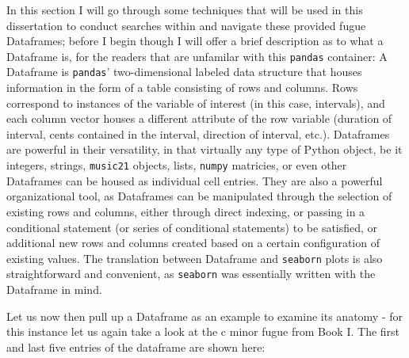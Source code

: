 In this section I will go through some techniques that will be used in
this dissertation to conduct searches within and navigate these provided
fugue Dataframes; before I begin though I will offer a brief description
as to what a Dataframe is, for the readers that are unfamilar with this
\texttt{pandas} container: A Dataframe is \texttt{pandas}'
two-dimensional labeled data structure that houses information in the
form of a table consisting of rows and columns. Rows correspond to
instances of the variable of interest (in this case, intervals), and
each column vector houses a different attribute of the row variable
(duration of interval, cents contained in the interval, direction of
interval, etc.). Dataframes are powerful in their versatility, in that
virtually any type of Python object, be it integers, strings,
\texttt{music21} objects, lists, \texttt{numpy} matricies, or even other
Dataframes can be housed as individual cell entries. They are also a
powerful organizational tool, as Dataframes can be manipulated through
the selection of existing rows and columns, either through direct
indexing, or passing in a conditional statement (or series of
conditional statements) to be satisfied, or additional new rows and
columns created based on a certain configuration of existing values. The
translation between Dataframe and \texttt{seaborn} plots is also
straightforward and convenient, as \texttt{seaborn} was essentially
written with the Dataframe in mind.

Let us now then pull up a Dataframe as an example to examine its anatomy
- for this instance let us again take a look at the c minor fugue from
Book I. The first and last five entries of the dataframe are shown here:



